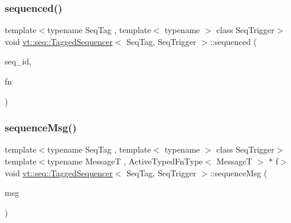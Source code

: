 \subsubsection{\texorpdfstring{sequenced()}{sequenced()}\hspace{0.1cm}{\footnotesize\ttfamily [3/3]}}
{\footnotesize\ttfamily template$<$typename Seq\+Tag , template$<$ typename $>$ class Seq\+Trigger$>$ \\
void \hyperlink{structvt_1_1seq_1_1_tagged_sequencer}{vt\+::seq\+::\+Tagged\+Sequencer}$<$ Seq\+Tag, Seq\+Trigger $>$\+::sequenced (\begin{DoxyParamCaption}\item[{\hyperlink{structvt_1_1seq_1_1_tagged_sequencer_a1c8ee839258d0f88c49ef660267a81d5}{Seq\+Type} const \&}]{seq\+\_\+id,  }\item[{\hyperlink{namespacevt_1_1seq_a26c632e5cbf02395a8bbd9aa4c761232}{Func\+Type} const \&}]{fn }\end{DoxyParamCaption})}

\mbox{\label{structvt_1_1seq_1_1_tagged_sequencer_a51470994cb625a098a7ebb9ccc489ec7}} 
\subsubsection{\texorpdfstring{sequence\+Msg()}{sequenceMsg()}}
{\footnotesize\ttfamily template$<$typename Seq\+Tag , template$<$ typename $>$ class Seq\+Trigger$>$ \\
template$<$typename MessageT , Active\+Typed\+Fn\+Type$<$ Message\+T $>$ $\ast$ f$>$ \\
void \hyperlink{structvt_1_1seq_1_1_tagged_sequencer}{vt\+::seq\+::\+Tagged\+Sequencer}$<$ Seq\+Tag, Seq\+Trigger $>$\+::sequence\+Msg (\begin{DoxyParamCaption}\item[{MessageT $\ast$}]{msg }\end{DoxyParamCaption})}

\mbox{\label{structvt_1_1seq_1_1_tagged_sequencer_a580a0fd2ced16f447351f142f1438e42}} 
